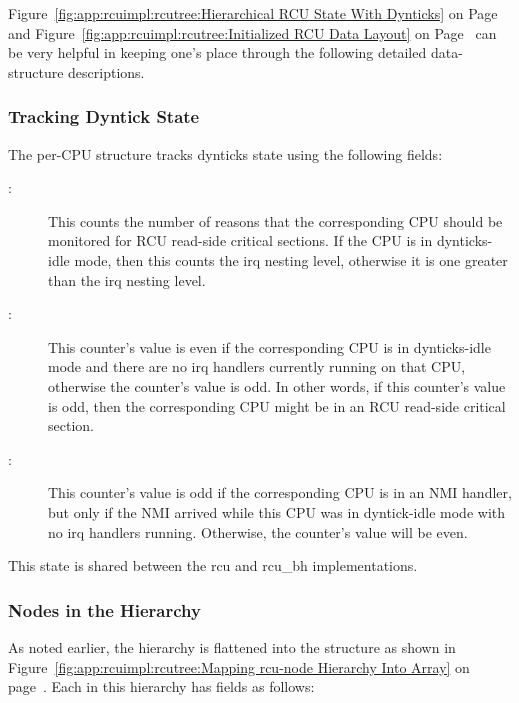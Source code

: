 Figure~\ref{fig:app:rcuimpl:rcutree:Hierarchical RCU State With Dynticks}
on
Page~\pageref{fig:app:rcuimpl:rcutree:Hierarchical RCU State With Dynticks}
and
Figure~\ref{fig:app:rcuimpl:rcutree:Initialized RCU Data Layout}
on
Page~\pageref{fig:app:rcuimpl:rcutree:Initialized RCU Data Layout}
can be very helpful in keeping one's place through the following detailed
data-structure descriptions.

\subsubsection{Tracking Dyntick State}
\label{app:rcuimpl:rcutreewt:Tracking Dyntick State}

The per-CPU  structure tracks dynticks state using the
following fields:

\begin{description}
\item[:]
	This  counts the number of reasons that the corresponding
	CPU should be monitored for RCU read-side critical sections.
	If the CPU is in dynticks-idle mode, then this counts the
	irq nesting level, otherwise it is one greater than the
	irq nesting level.
\item[:]
	This  counter's value is even if the corresponding CPU is
	in dynticks-idle mode and there are no irq handlers currently
	running on that CPU, otherwise the counter's value is odd.
	In other words, if this counter's value is odd, then the
	corresponding CPU might be in an RCU read-side critical section.
\item[:]
	This  counter's value is odd if the corresponding CPU is
	in an NMI handler, but only if the NMI arrived while this
	CPU was in dyntick-idle mode with no irq handlers running.
	Otherwise, the counter's value will be even.
\end{description}

This state is shared between the rcu and rcu\_bh implementations.

\subsubsection{Nodes in the Hierarchy}
\label{app:rcuimpl:rcutreewt:Nodes in the Hierarchy}

As noted earlier, the  hierarchy is flattened into
the  structure as shown in
Figure~\ref{fig:app:rcuimpl:rcutree:Mapping rcu-node Hierarchy Into Array}
on
page~\pageref{fig:app:rcuimpl:rcutree:Mapping rcu-node Hierarchy Into Array}.
Each  in this hierarchy has fields as follows:

